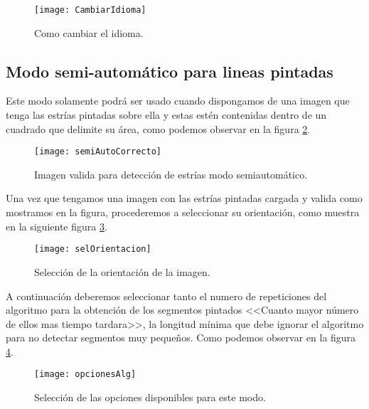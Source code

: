 \begin{figure}[h]
\centering
\texttt{[image: CambiarIdioma]}
\caption{Como cambiar el idioma.}
\label{fig:camb}
\end{figure}

\subsection{Modo semi-automático para lineas pintadas}

Este modo solamente podrá ser usado cuando dispongamos de una imagen que tenga las estrías pintadas sobre ella y estas estén contenidas dentro de un cuadrado que delimite su área, como podemos observar en la figura \ref{fig:semiAutoCorrecto}.



\begin{figure}[h]
\centering
\texttt{[image: semiAutoCorrecto]}
\caption{Imagen valida para detección de estrías modo semiautomático.}
\label{fig:semiAutoCorrecto}
\end{figure}

Una vez que tengamos una imagen con las estrías pintadas cargada y valida como mostramos en la figura, procederemos a seleccionar su orientación, como muestra en la siguiente figura \ref{fig:selOrientacion}.

\begin{figure}[h]
\centering
\texttt{[image: selOrientacion]}
\caption{Selección de la orientación de la imagen.}
\label{fig:selOrientacion}
\end{figure}

A continuación deberemos seleccionar tanto el numero de repeticiones del algoritmo para la obtención de los segmentos pintados <<Cuanto mayor número de ellos mas tiempo tardara>>, la longitud mínima que debe ignorar el algoritmo para no detectar segmentos muy pequeños. Como podemos observar en la figura \ref{fig:opcionesAlg}.

\begin{figure}[h]
\centering
\texttt{[image: opcionesAlg]}
\caption{Selección de las opciones disponibles para este modo.}
\label{fig:opcionesAlg}
\end{figure}

